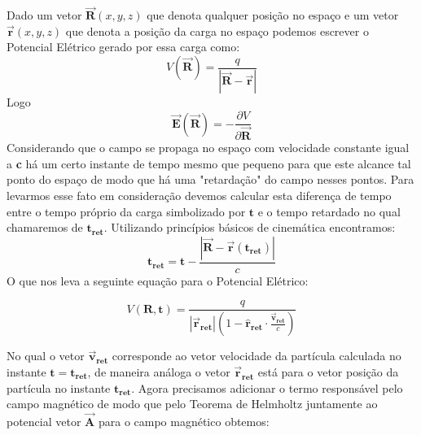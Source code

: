 \documentclass{article}
\begin{document}
\hspace{0.45cm}Dado um vetor $\vec{\mathbf{R}}(x,y,z)$ que denota qualquer posição no espaço e um vetor $\vec{\mathbf{r}}(x,y,z)$ que denota a posição da carga no espaço podemos escrever o Potencial Elétrico gerado por essa carga como:
\begin{equation}
    V(\vec{\mathbf{R}}) = \frac{q}{|\vec{\mathbf{R}} - \vec{\mathbf{r}}|}
\end{equation}
\hspace{0.45cm}Logo
\begin{equation}
    \vec{\mathbf{E}}(\vec{\mathbf{R}}) = - \frac{\partial V}{\partial \vec{\textbf{R}}}
\end{equation}
\hspace{0.45cm}Considerando que o campo se propaga no espaço com velocidade constante igual a \textbf{c} há um certo instante de tempo mesmo que pequeno para que este alcance tal ponto do espaço de modo que há uma "retardação" do campo nesses pontos. Para levarmos esse fato em consideração devemos calcular esta diferença de tempo entre o tempo próprio da carga simbolizado por $\mathbf{t}$ e o tempo retardado no qual chamaremos de $\mathbf{t_{ret}}$. Utilizando princípios básicos de cinemática encontramos:
\begin{equation}
    \mathbf{t_{ret}} = \mathbf{t} - \frac{|\vec{\mathbf{R}} - \vec{\mathbf{r}}\mathbf{(t_{ret})}|}{c}
\end{equation}
\hspace{0.45cm}O que nos leva a seguinte equação para o Potencial Elétrico:
    

\begin{equation}
    V(\mathbf{R} , \mathbf{t}) = \frac{q}{|\vec{\mathbf{r}}_\mathbf{ret}|(1 - \hat{\mathbf{r}}_\mathbf{ret} \cdot \frac{\vec{\mathbf{v}}_\mathbf{ret}}{c}) } 
\end{equation}

No qual o vetor $\vec{\mathbf{v}}_\mathbf{ret}$ corresponde ao vetor velocidade da partícula calculada no instante $\mathbf{t} = \mathbf{t_{ret}}$, de maneira análoga o vetor $\vec{\mathbf{r}}_\mathbf{ret}$ está para o vetor posição da partícula no instante $\mathbf{t_{ret}}$. Agora precisamos adicionar o termo responsável pelo campo magnético de modo que pelo Teorema de Helmholtz juntamente ao potencial vetor $\vec{\mathbf{A}}$ para o campo magnético obtemos:
\end{document}
